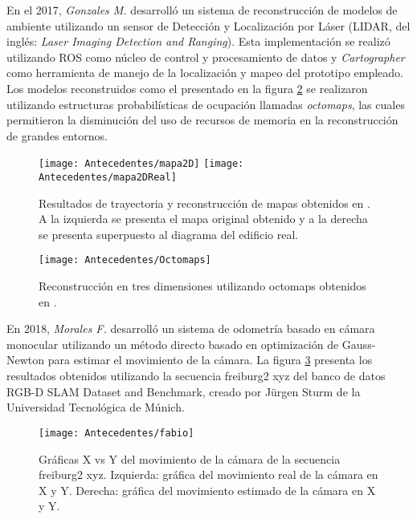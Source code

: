 En el 2017, \textit{Gonzales M.} \cite{manuel} desarrolló un sistema de reconstrucción de modelos de ambiente utilizando un sensor de Detección y Localización por Láser (LIDAR, del inglés: \textit{Laser Imaging Detection and Ranging}). Esta implementación se realizó utilizando ROS como núcleo de control y procesamiento de datos y \textit{Cartographer} como herramienta de manejo de la localización y mapeo del prototipo empleado. Los modelos reconstruidos como el presentado en la figura \ref{imagen:Antecedentes/octomaps} se realizaron utilizando estructuras probabilísticas de ocupación llamadas \textit{octomaps}, las cuales permitieron la disminución del uso de recursos de memoria en la reconstrucción de grandes entornos.


\begin{figure}[H]
	\centering
	\texttt{[image: Antecedentes/mapa2D]}
	\texttt{[image: Antecedentes/mapa2DReal]}
	\caption[Resultados de trayectoria y reconstrucción de mapas obtenidos en \cite{manuel}] {Resultados de trayectoria y reconstrucción de mapas obtenidos en \cite{manuel}. A la izquierda se presenta el mapa original obtenido y a la derecha se presenta superpuesto al diagrama del edificio real.}
	\label{imagen:Antecedentes/mapa2D}
\end{figure}


\begin{figure}[H]
	\centering
	\texttt{[image: Antecedentes/Octomaps]}
	\caption[Reconstrucción en tres dimensiones utilizando octomaps obtenidos
	en  \cite{manuel}]{Reconstrucción en tres dimensiones utilizando octomaps obtenidos
		en  \cite{manuel}.}
	\label{imagen:Antecedentes/octomaps}
\end{figure}

En 2018,  \textit{Morales F.} \cite{fabio} desarrolló un sistema de odometría basado en cámara monocular utilizando un método directo basado en optimización de Gauss-Newton para estimar el movimiento de la cámara. La figura \ref{imagen:Antecedentes/fabio} presenta los resultados obtenidos utilizando la secuencia freiburg2 xyz del banco de datos RGB-D SLAM Dataset and Benchmark, creado por Jürgen
Sturm de la Universidad Tecnológica de Múnich.

\begin{figure}[H]
	\centering
	\texttt{[image: Antecedentes/fabio]}
	\caption[Gráficas X vs Y del movimiento de la cámara de la secuencia
	freiburg2 xyz] {Gráficas X vs Y del movimiento de la cámara de la secuencia
		freiburg2 xyz. Izquierda: gráfica del movimiento real de la cámara en X y Y.
		Derecha: gráfica del movimiento estimado de la cámara en X y Y.}
	\label{imagen:Antecedentes/fabio}
\end{figure}

